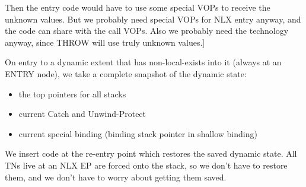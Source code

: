 Then the entry code would have to use some special VOPs to receive the unknown
values.  But we probably need special VOPs for NLX entry anyway, and the code
can share with the call VOPs.  Also we probably need the technology anyway,
since THROW will use truly unknown values.]


On entry to a dynamic extent that has non-local-exists into it (always at an
ENTRY node), we take a complete snapshot of the dynamic state:

\begin{itemize}
\item the top pointers for all stacks
\item current Catch and Unwind-Protect
\item current special binding (binding stack pointer in shallow binding)
\end{itemize}

We insert code at the re-entry point which restores the saved dynamic state.
All TNs live at an NLX EP are forced onto the stack, so we don't have to restore
them, and we don't have to worry about getting them saved.

